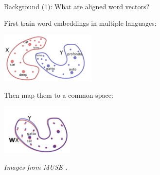 \documentclass{beamer}
\begin{document}
\begin{frame}{Background (1): What are aligned word vectors?}

    First train word embeddings in multiple languages:%
    
    \hspace{0.5in}\includegraphics[height=1in]{img/muse1}

    \vspace{0.15in}
    Then map them to a common space:

    \hspace{0.5in}\includegraphics[height=1in]{img/muse2}

    \vspace{0.15in}
    {\small
    \emph{Images from MUSE \citep{conneau2017word}.}
    }

\end{frame}

\end{document}
